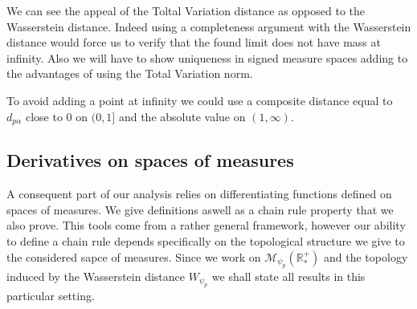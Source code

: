 \documentclass[11pt,a4paper]{article}
\newcommand{\RRP}{\mathbb{R}^+_*}
\newcommand{\MC}{\mathcal{M}}
\begin{document}
We can see the appeal of the Toltal Variation distance as opposed to the Wasserstein distance. Indeed using a completeness argument with the Wasserstein distance would force us to verify that the found limit does not have mass at infinity. Also we will have to show uniqueness in signed measure spaces adding to the advantages of using the Total Variation norm. 

To avoid adding a point at infinity we could use a composite distance equal to $d_{p\alpha}$ close to $0$ on $(0,1]$ and the absolute value on $(1, \infty)$. 
\subsection{Derivatives on spaces of measures}
A consequent part of our analysis relies on differentiating functions defined on spaces of measures. We give definitions aswell as a chain rule property that we also prove. This tools come from a rather general framework, however our ability to define a chain rule depends specifically on the topological structure we give to the considered sapce of measures. Since we work on $\MC_{\psi_p}(\RRP)$ and the topology induced by the Wasserstein distance $W_{\psi_p}$ we shall state all results in this particular setting.
\end{document}
